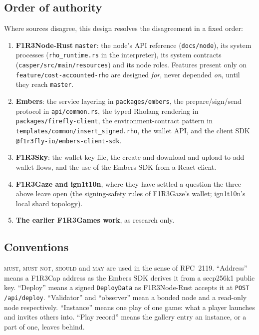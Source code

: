 \documentclass[11pt]{article}
\theoremstyle{definition}
\theoremstyle{remark}
\newcommand{\MUST}{\textsc{must}}
\newcommand{\MUSTNOT}{\textsc{must not}}
\newcommand{\SHOULD}{\textsc{should}}
\newcommand{\MAY}{\textsc{may}}
\newcommand{\code}[1]{\texttt{#1}}
\newcommand{\Nd}{F1R3Node-Rust}
\newcommand{\Em}{Embers}
\newcommand{\Sky}{F1R3Sky}
\newcommand{\Gz}{F1R3Gaze}
\begin{document}
\subsection{Order of authority}\label{sec:authority}

Where sources disagree, this design resolves the disagreement in a fixed order:

\begin{enumerate}[leftmargin=*,itemsep=2pt]
\item \textbf{\Nd{}} \code{master}: the node's API reference (\code{docs/node}), its
  system processes (\code{rho\_runtime.rs} in the interpreter), its system
  contracts (\code{casper/src/main/resources}) and its node roles. Features present
  only on \code{feature/cost-accounted-rho} are designed \emph{for}, never depended
  \emph{on}, until they reach \code{master}.
\item \textbf{\Em{}}: the service layering in \code{packages/embers}, the
  prepare/sign/send protocol in \code{api/common.rs}, the typed Rholang rendering in
  \code{packages/firefly-client}, the environment-contract pattern in
  \code{templates/common/insert\_signed.rho}, the wallet API, and the client SDK
  \code{@f1r3fly-io/embers-client-sdk}.
\item \textbf{\Sky{}}: the wallet key file, the create-and-download and
  upload-to-add wallet flows, and the use of the \Em{} SDK from a React client.
\item \textbf{\Gz{} and ign1t10n}, where they have settled a question the three above
  leave open (the signing-safety rules of \Gz{}'s wallet; ign1t10n's local shard
  topology).
\item \textbf{The earlier F1R3Games work}, as research only.
\end{enumerate}

\subsection{Conventions}

\MUST, \MUSTNOT, \SHOULD{} and \MAY{} are used in the sense of RFC~2119. ``Address''
means a F1R3Cap address as the \Em{} SDK derives it from a secp256k1 public key.
``Deploy'' means a signed \code{DeployData} as \Nd{} accepts it at \code{POST
/api/deploy}. ``Validator'' and ``observer'' mean a bonded node and a read-only node
respectively. ``Instance'' means one play of one game: what a player launches and
invites others into. ``Play record'' means the gallery entry an instance, or a part
of one, leaves behind.
\end{document}
